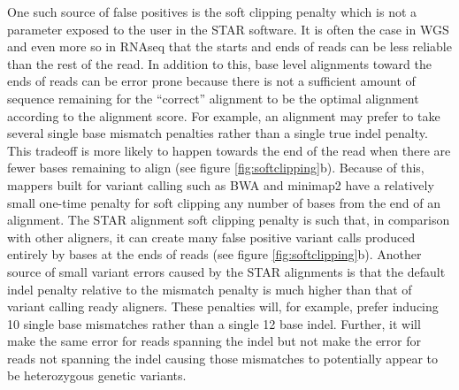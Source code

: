 \par{
One such source of false positives is the 
soft clipping penalty which is not a parameter exposed to the user in the STAR software. It is often the case in WGS and even more so in RNAseq that the starts and ends of
reads can be less reliable than the rest of the read. In addition to this, base level alignments toward the ends of reads can be error prone because there is not a sufficient amount of sequence remaining for the ``correct'' alignment to be the optimal alignment according to the alignment score. For example, an alignment may prefer to take several single base mismatch penalties rather than a single true indel penalty. This tradeoff is more likely to happen towards the end of the read when there are fewer bases remaining to align (see figure \ref{fig:softclipping}b). Because of this, mappers built for variant calling such as BWA\cite{bwa} and minimap2\cite{minimap2} have 
a relatively small one-time penalty for soft clipping any number of bases from the end of an alignment\cite{variantartifacts}. The STAR alignment soft clipping penalty is such that, in 
comparison with other aligners, it can create many false positive variant calls produced entirely by bases at the ends of reads (see figure \ref{fig:softclipping}b). Another source of 
small variant errors caused by the STAR alignments is that the default indel penalty relative to the mismatch penalty is much higher than that of 
variant calling ready aligners. These penalties will, for example, prefer inducing 10 single base mismatches rather than a single 12 base indel. Further, it will make the same error for reads spanning the indel but not make the error for reads not spanning the indel causing those mismatches to potentially appear to be heterozygous genetic variants. 
}


